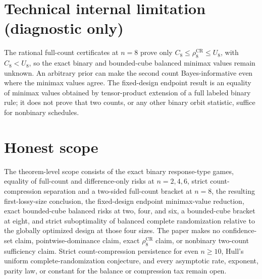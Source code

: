 \documentclass{article}
\begin{document}
\section*{Technical internal limitation (diagnostic only)}

The rational full-count certificates at \(n=8\) prove only \(C_8\leq\rho_8^{\mathrm{CR}}\leq U_8\), with \(C_8<U_8\), so the exact binary and bounded-cube balanced minimax values remain unknown. An arbitrary prior can make the second count Bayes-informative even where the minimax values agree. The fixed-design endpoint result is an equality of minimax values obtained by tensor-product extension of a full labeled binary rule; it does not prove that two counts, or any other binary orbit statistic, suffice for nonbinary schedules.

\section{Honest scope}

The theorem-level scope consists of the exact binary response-type games, equality of full-count and difference-only risks at \(n=2,4,6\), strict count-compression separation and a two-sided full-count bracket at \(n=8\), the resulting first-lossy-size conclusion, the fixed-design endpoint minimax-value reduction, exact bounded-cube balanced risks at two, four, and six, a bounded-cube bracket at eight, and strict suboptimality of balanced complete randomization relative to the globally optimized design at those four sizes. The paper makes no confidence-set claim, pointwise-dominance claim, exact \(\rho_8^{\mathrm{CR}}\) claim, or nonbinary two-count sufficiency claim. Strict count-compression persistence for even \(n\geq10\), Hull's uniform complete-randomization conjecture, and every asymptotic rate, exponent, parity law, or constant for the balance or compression tax remain open.
\end{document}
